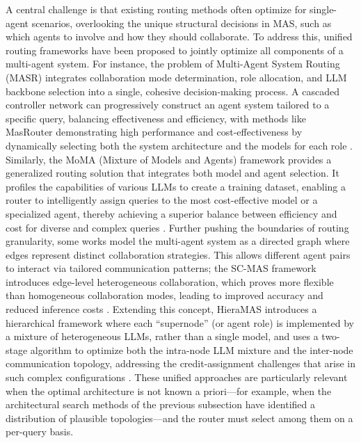 \documentclass[11pt]{article}
\begin{document}
A central challenge is that existing routing methods often optimize for single-agent scenarios, overlooking the unique structural decisions in MAS, such as which agents to involve and how they should collaborate. To address this, unified routing frameworks have been proposed to jointly optimize all components of a multi-agent system. For instance, the problem of Multi-Agent System Routing (MASR) integrates collaboration mode determination, role allocation, and LLM backbone selection into a single, cohesive decision-making process. A cascaded controller network can progressively construct an agent system tailored to a specific query, balancing effectiveness and efficiency, with methods like MasRouter demonstrating high performance and cost-effectiveness by dynamically selecting both the system architecture and the models for each role \cite{ref280}. Similarly, the MoMA (Mixture of Models and Agents) framework provides a generalized routing solution that integrates both model and agent selection. It profiles the capabilities of various LLMs to create a training dataset, enabling a router to intelligently assign queries to the most cost-effective model or a specialized agent, thereby achieving a superior balance between efficiency and cost for diverse and complex queries \cite{ref281}. Further pushing the boundaries of routing granularity, some works model the multi-agent system as a directed graph where edges represent distinct collaboration strategies. This allows different agent pairs to interact via tailored communication patterns; the SC-MAS framework introduces edge-level heterogeneous collaboration, which proves more flexible than homogeneous collaboration modes, leading to improved accuracy and reduced inference costs \cite{ref102}. Extending this concept, HieraMAS introduces a hierarchical framework where each ``supernode'' (or agent role) is implemented by a mixture of heterogeneous LLMs, rather than a single model, and uses a two-stage algorithm to optimize both the intra-node LLM mixture and the inter-node communication topology, addressing the credit-assignment challenges that arise in such complex configurations \cite{ref52}. These unified approaches are particularly relevant when the optimal architecture is not known a priori---for example, when the architectural search methods of the previous subsection have identified a distribution of plausible topologies---and the router must select among them on a per-query basis.
\end{document}
